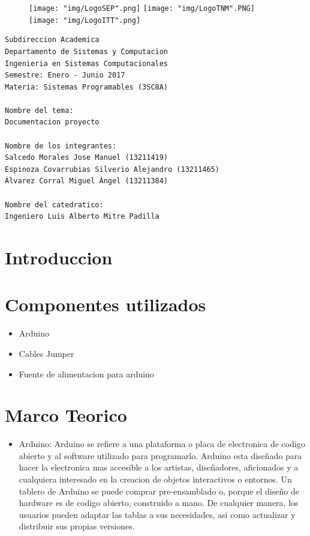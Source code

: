 \documentclass{article}
\begin{document}
\begin{figure}[!htb]
	\texttt{[image: "img/LogoSEP".png]}
\endminipage\hfill
{}
	\texttt{[image: "img/LogoTNM".PNG]}
\endminipage\hfill
{}
	\texttt{[image: "img/LogoITT".png]}
\endminipage\hfill
\end{figure}

\begingroup
\LARGE
\begin{verbatim}
Subdireccion Academica
Departamento de Sistemas y Computacion
Ingenieria en Sistemas Computacionales
Semestre: Enero - Junio 2017
Materia: Sistemas Programables (3SC8A)

Nombre del tema:
Documentacion proyecto

Nombre de los integrantes:
Salcedo Morales Jose Manuel (13211419)
Espinoza Covarrubias Silverio Alejandro (13211465)
Álvarez Corral Miguel Ángel (13211384)

Nombre del catedratico:
Ingeniero Luis Alberto Mitre Padilla

\end{verbatim}
\endgroup

\newpage
\tableofcontents

\newpage
\section{Introduccion}

\section{Componentes utilizados}
\begin{itemize}
        \item Arduino
        \item Cables Jumper
        \item Fuente de alimentacion para arduino
\end{itemize}

\newpage
\section{Marco Teorico}
\begin{itemize}
	\item Arduino: Arduino se refiere a una plataforma o placa de electronica de codigo abierto y al software utilizado para programarlo. Arduino esta diseñado para hacer la electronica mas accesible a los artistas, diseñadores, aficionados y a cualquiera interesado en la creacion de objetos interactivos o entornos. Un tablero de Arduino se puede comprar pre-ensamblado o, porque el diseño de hardware es de codigo abierto, construido a mano. De cualquier manera, los usuarios pueden adaptar las tablas a sus necesidades, asi como actualizar y distribuir sus propias versiones.
\end{itemize}
\end{document}
